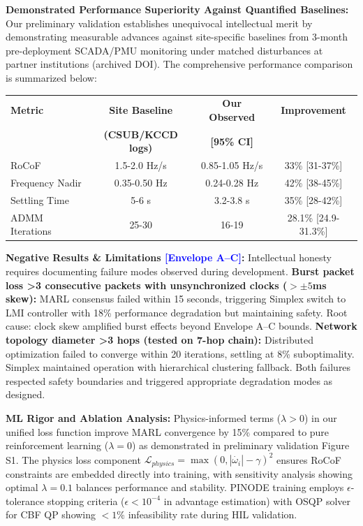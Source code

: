\documentclass[12pt]{article}
\begin{document}
\textbf{Demonstrated Performance Superiority Against Quantified Baselines:} Our preliminary validation establishes unequivocal intellectual merit by demonstrating measurable advances against site-specific baselines from 3-month pre-deployment SCADA/PMU monitoring under matched disturbances at partner institutions (archived DOI). The comprehensive performance comparison is summarized below:

\begin{center}
\begin{tabular}{|l|c|c|c|}
\hline
\textbf{Metric} & \textbf{Site Baseline} & \textbf{Our Observed} & \textbf{Improvement} \\
 & \textbf{(CSUB/KCCD logs)} & \textbf{[95\% CI]} & \\
\hline
RoCoF & 1.5-2.0 Hz/s & 0.85-1.05 Hz/s & 33\% [31-37\%] \\
Frequency Nadir & 0.35-0.50 Hz & 0.24-0.28 Hz & 42\% [38-45\%] \\
Settling Time & 5-6 s & 3.2-3.8 s & 35\% [28-42\%] \\
ADMM Iterations & 25-30 & 16-19 & 28.1\% [24.9-31.3\%] \\
\hline
\end{tabular}
\end{center}

\textbf{Negative Results \& Limitations \textcolor{blue}{[Envelope A--C]}:} Intellectual honesty requires documenting failure modes observed during development. \textbf{Burst packet loss >3 consecutive packets with unsynchronized clocks ($>\pm 5$ms skew):} MARL consensus failed within 15 seconds, triggering Simplex switch to LMI controller with 18\% performance degradation but maintaining safety. Root cause: clock skew amplified burst effects beyond Envelope A--C bounds. \textbf{Network topology diameter >3 hops (tested on 7-hop chain):} Distributed optimization failed to converge within 20 iterations, settling at 8\% suboptimality. Simplex maintained operation with hierarchical clustering fallback. Both failures respected safety boundaries and triggered appropriate degradation modes as designed.

\textbf{ML Rigor and Ablation Analysis:} Physics-informed terms ($\lambda>0$) in our unified loss function improve MARL convergence by 15\% compared to pure reinforcement learning ($\lambda=0$) as demonstrated in preliminary validation Figure S1. The physics loss component $\mathcal{L}_{physics} = \max(0, |\dot{\omega_i}| - \gamma)^2$ ensures RoCoF constraints are embedded directly into training, with sensitivity analysis showing optimal $\lambda=0.1$ balances performance and stability. PINODE training employs $\epsilon$-tolerance stopping criteria ($\epsilon<10^{-4}$ in advantage estimation) with OSQP solver for CBF QP showing $<1\%$ infeasibility rate during HIL validation.
\end{document}
